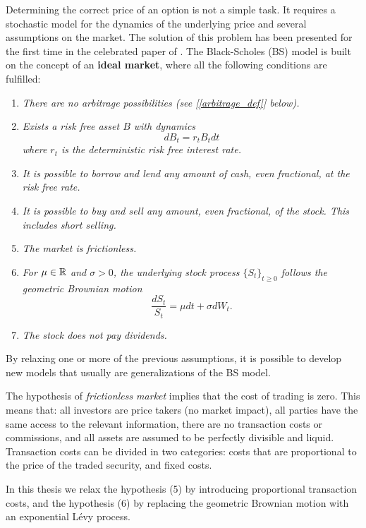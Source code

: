 Determining the correct price of an option is not a simple task. 
It requires a stochastic model for the dynamics of the underlying price and several assumptions on the market.
The solution of this problem has been presented for the first time in the celebrated paper of \cite{BS73}. 
The Black-Scholes (BS) model is built on the concept of an \textbf{ideal market}, where all the following 
conditions are fulfilled:
\begin{enumerate}
 \item \emph{There are no arbitrage possibilities (see [\ref{arbitrage_def}] below).}
 \item \emph{Exists a risk free asset $B$ with dynamics
        \begin{equation}
         dB_t = r_t B_t dt
        \end{equation}
        where $r_t$ is the deterministic risk free interest rate.}
 \item \emph{It is possible to borrow and lend any amount of cash, even fractional, at the risk free rate.}
 \item \emph{It is possible to buy and sell any amount, even fractional, of the stock. This includes short selling.}
 \item \emph{The market is frictionless.}
 \item \emph{For $\mu \in \mathbb{R}$ and $\sigma > 0$, the underlying stock process $\{S_t\}_{t\geq 0}$ follows the geometric Brownian motion}
	\begin{equation}\label{GBM2}
	  \frac{dS_t}{S_t} = \mu dt + \sigma dW_t.
	\end{equation}
\item \emph{The stock does not pay dividends.}	
\end{enumerate}

By relaxing one or more of the previous assumptions, it is possible to develop new models that usually are generalizations of the BS model. 

The hypothesis of \emph{frictionless market} implies that the cost of trading is zero. This means that: all investors are price takers (no market impact), 
all parties have the same access to the relevant information, there are no transaction costs or commissions, and all assets are
assumed to be perfectly divisible and liquid.
Transaction costs can be divided in two categories: costs that are proportional to the price of the traded security, and fixed costs. 

In this thesis we relax the hypothesis (5) by introducing proportional transaction costs, and the hypothesis (6) by replacing the geometric Brownian motion
with an exponential Lévy process.

